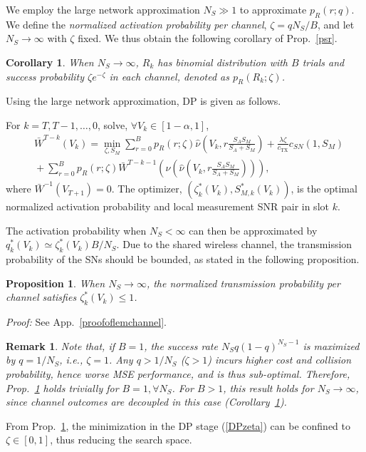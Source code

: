 \documentclass[10pt,twocolumn,twoside]{IEEEtran}
\newtheorem{propos}{Proposition}
\newtheorem{corol}{Corollary}
\theoremstyle{plain}
\newtheorem{remark}{Remark}
\begin{document}
\noindent We employ the large network approximation $N_S{\gg}1$ to approximate $p_R(r;q)$.
We define the \emph{normalized activation probability per channel},
$\zeta=qN_S/B$, and let $N_S\to\infty$ with $\zeta$ fixed. 
We thus obtain the following corollary of Prop.~\ref{psr}.
\begin{corol}
\label{corol1}
When $N_S\to\infty$,
$R_k$
 has binomial distribution with $B$ trials and success probability $\zeta e^{-\zeta}$
in each channel, denoted as $p_R(R_k;\zeta)$.
\end{corol}

Using the large network approximation, DP is given as follows.

 For $k=T,T-1,\dots,0$, solve, $\forall V_k{\in}[1-\alpha,1]$,
  \begin{align}
  \label{DPzeta}
&\!\!\!\!\bar W^{T-k}(V_{k})
\!\!=\!\!\min_{\zeta,S_{M}}\!\sum_{r=0}^Bp_R(r;\zeta)\hat \nu\left(\!\!V_{k},r\frac{S_AS_M}{S_A\!\!+\!\!S_M}\!\right)
\!\!+\!\!\frac{\!\lambda\zeta\!}{\!c_{\mathrm{TX}}\!} c_{SN}(1,\!S_{M}\!)
\nonumber
\\&
\!+\!\sum_{r=0}^Bp_R(r;\zeta)
\bar W^{T-k-1}\left(\nu\left(\hat \nu\left(V_{k},r\frac{S_AS_M}{S_A+S_M}\right)\right)\right),
\end{align}
where $\bar W^{-1}(V_{T+1})=0$. The optimizer, $(\zeta_k^*(V_k),S_{M,k}^*(V_k))$, is the optimal normalized activation probability and local measurement SNR pair in slot $k$.
\hfill\QED

The activation probability when $N_S<\infty$ can then be approximated by $q_{k}^*(V_k)\simeq\zeta_k^*(V_k) B/N_S$.
Due to the shared wireless channel, the transmission probability of the SNs should be bounded, as stated in the following proposition.
\begin{propos}
\label{zetaopt}
When $N_S\to\infty$, the normalized transmission probability per channel satisfies $\zeta_k^*(V_k)\leq 1$.
\end{propos}
\noindent\emph{Proof:}
See App.~\ref{proofoflemchannel}.
\hfill\QED
\vspace{-0.2cm}
\begin{remark}
\label{rem2}
Note that, if $B{=}1$, the success rate $N_Sq(1{-}q)^{N_S-1}$ is maximized by $q{=}1/N_S$, \emph{i.e.}, $\zeta{=}1$.
Any $q{>}1/N_S$ ($\zeta{>}1$) incurs higher cost and collision probability, hence worse MSE performance, and is thus sub-optimal.
Therefore, Prop.~\ref{zetaopt} holds trivially for $B{=}1,\forall N_S$.
For $B>1$, this result holds for $N_S\to\infty$, since channel outcomes are decoupled in this case (Corollary~\ref{corol1}).
\end{remark}
From Prop.~\ref{zetaopt}, the minimization in the DP stage (\ref{DPzeta})
can be confined to $\zeta\in [0,1]$, thus reducing the search space.
\end{document}
